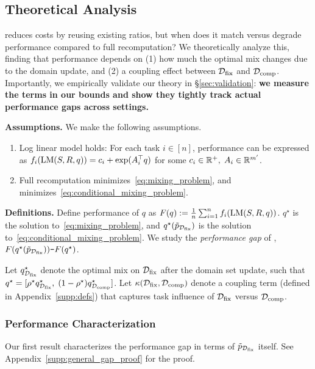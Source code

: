\subsection{Theoretical Analysis}\label{sec:analysis}

\fullmixreuse reduces costs by reusing existing ratios, but when does it match versus degrade performance compared to full recomputation? We theoretically analyze this, finding that performance depends on (1) how much the optimal mix changes due to the domain update, and (2) a coupling effect between $\mathcal{D}_{\text{fix}}$ and $\mathcal{D}_{\text{comp}}$.
Importantly, we empirically validate our theory in \S\ref{sec:validation}: \textbf{we measure the terms in our bounds and show they tightly track actual performance gaps across settings.}

\textbf{Assumptions.} We make the following assumptions.
\begin{enumerate}[itemsep=0pt,topsep=2pt,leftmargin=12pt]
    \item Log linear model holds: For each task $i\in[n]$, performance can be expressed as $f_i(\text{LM}(S,R,q)) = c_i + \exp(A_i^\top q)$ for some $c_i\in\mathbb{R}^+,\; A_i\in\mathbb{R}^{m'}$.
    \item Full recomputation minimizes~\eqref{eq:mixing_problem}, and \fullmixreuse minimizes~\eqref{eq:conditional_mixing_problem}. 
\end{enumerate}


\textbf{Definitions.}
Define performance of $q$ as $F(q) := \frac{1}{n}\sum_{i=1}^n f_i(\text{LM}(S,R,q))$. $q^\star$ is the solution to~\eqref{eq:mixing_problem}, and $q^\star(\tilde p_{\mathcal{D}_{\text{fix}}})$ is the solution to~\eqref{eq:conditional_mixing_problem}. We study the \emph{performance gap} of \fullmixreuse, $F(q^\star(\tilde p_{\mathcal{D}_{\text{fix}}})) \texttt{-} F(q^\star)$.

Let $q^\star_{\mathcal{D}_{\text{fix}}}$ denote the optimal mix on $\mathcal{D}_{\text{fix}}$ after the domain set update, such that $q^\star = [\rho^\star q^\star_{\mathcal{D}_{\text{fix}}},\; (1-\rho^\star)q^\star_{\mathcal{D}_{\text{comp}}}]$. Let $\kappa(\mathcal{D}_{\text{fix}}, \mathcal{D}_{\text{comp}})$ denote a coupling term (defined in Appendix~\ref{supp:defs}) that captures task influence of $\mathcal{D}_{\text{fix}}$ versus $\mathcal{D}_{\text{comp}}$.



\subsubsection{Performance Characterization}

Our first result characterizes the performance gap in terms of $\tilde{p}_{\mathcal{D}_{\text{fix}}}$ itself. See Appendix~\ref{supp:general_gap_proof} for the proof. 


